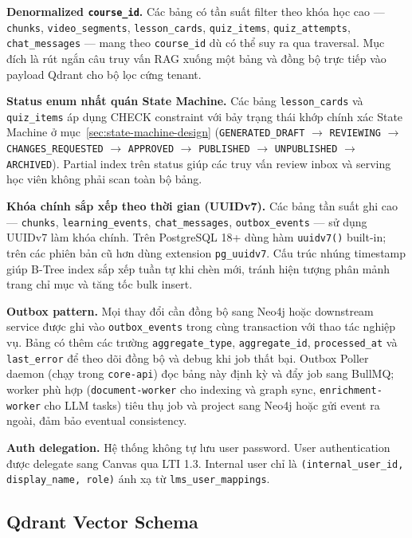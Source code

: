 \textbf{Denormalized \texttt{course\_id}.} Các bảng có tần suất filter theo
khóa học cao --- \texttt{chunks}, \texttt{video\_segments},
\texttt{lesson\_cards}, \texttt{quiz\_items}, \texttt{quiz\_attempts},
\texttt{chat\_messages} --- mang theo \texttt{course\_id} dù có thể suy ra
qua traversal. Mục đích là rút ngắn câu truy vấn RAG xuống một bảng và đồng
bộ trực tiếp vào payload Qdrant cho bộ lọc cứng tenant.

\textbf{Status enum nhất quán State Machine.} Các bảng \texttt{lesson\_cards}
và \texttt{quiz\_items} áp dụng CHECK constraint với bảy trạng thái khớp
chính xác State Machine ở mục~\ref{sec:state-machine-design}
(\texttt{GENERATED\_DRAFT} $\to$ \texttt{REVIEWING} $\to$
\texttt{CHANGES\_REQUESTED} $\to$ \texttt{APPROVED} $\to$
\texttt{PUBLISHED} $\to$ \texttt{UNPUBLISHED} $\to$ \texttt{ARCHIVED}).
Partial index trên status giúp các truy vấn review inbox và serving học
viên không phải scan toàn bộ bảng.

\textbf{Khóa chính sắp xếp theo thời gian (UUIDv7).} Các bảng tần suất ghi
cao --- \texttt{chunks}, \texttt{learning\_events}, \texttt{chat\_messages},
\texttt{outbox\_events} --- sử dụng UUIDv7 làm khóa chính. Trên PostgreSQL
18+ dùng hàm \texttt{uuidv7()} built-in; trên các phiên bản cũ hơn dùng
extension \texttt{pg\_uuidv7}. Cấu trúc nhúng timestamp giúp B-Tree index
sắp xếp tuần tự khi chèn mới, tránh hiện tượng phân mảnh trang chỉ mục và
tăng tốc bulk insert.

\textbf{Outbox pattern.} Mọi thay đổi cần đồng bộ sang Neo4j hoặc downstream
service được ghi vào \texttt{outbox\_events} trong cùng transaction với
thao tác nghiệp vụ. Bảng có thêm các trường \texttt{aggregate\_type},
\texttt{aggregate\_id}, \texttt{processed\_at} và \texttt{last\_error} để
theo dõi đồng bộ và debug khi job thất bại. Outbox Poller daemon (chạy
trong \texttt{core-api}) đọc bảng này định kỳ và đẩy job sang BullMQ; worker
phù hợp (\texttt{document-worker} cho indexing và graph sync,
\texttt{enrichment-worker} cho LLM tasks) tiêu thụ job và project sang
Neo4j hoặc gửi event ra ngoài, đảm bảo eventual consistency.

\textbf{Auth delegation.} Hệ thống không tự lưu user password. User
authentication được delegate sang Canvas qua LTI 1.3. Internal user chỉ là
\texttt{(internal\_user\_id, display\_name, role)} ánh xạ từ
\texttt{lms\_user\_mappings}.

\subsection{Qdrant Vector Schema}

